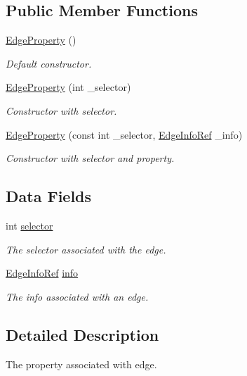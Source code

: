 \subsection*{Public Member Functions}
\begin{DoxyCompactItemize}
\item 
\hyperlink{structEdgeProperty_ae217733737f635662fc0232c9d980f7c}{Edge\+Property} ()
\begin{DoxyCompactList}\small\item\em Default constructor. \end{DoxyCompactList}\item 
\hyperlink{structEdgeProperty_a288355a231baac5b98f7b5557e28d0e9}{Edge\+Property} (int \+\_\+selector)
\begin{DoxyCompactList}\small\item\em Constructor with selector. \end{DoxyCompactList}\item 
\hyperlink{structEdgeProperty_a1f64d67b4555577f68690e32edd54fd0}{Edge\+Property} (const int \+\_\+selector, \hyperlink{edge__info_8hpp_a65ddc964b1738667fc720f0de33aeef9}{Edge\+Info\+Ref} \+\_\+info)
\begin{DoxyCompactList}\small\item\em Constructor with selector and property. \end{DoxyCompactList}\end{DoxyCompactItemize}
\subsection*{Data Fields}
\begin{DoxyCompactItemize}
\item 
int \hyperlink{structEdgeProperty_a72d059e00e64bb95ba8c4708262200e3}{selector}
\begin{DoxyCompactList}\small\item\em The selector associated with the edge. \end{DoxyCompactList}\item 
\hyperlink{edge__info_8hpp_a65ddc964b1738667fc720f0de33aeef9}{Edge\+Info\+Ref} \hyperlink{structEdgeProperty_aac4ebbbcb528a3e84e81b55abc742a9e}{info}
\begin{DoxyCompactList}\small\item\em The info associated with an edge. \end{DoxyCompactList}\end{DoxyCompactItemize}


\subsection{Detailed Description}
The property associated with edge. 


